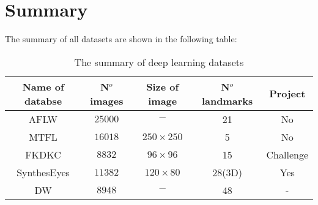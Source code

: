 \section{Summary}
The summary of all datasets are shown in the following table:\\
\begin{table}[!h]
	\centering
	\begin{tabular}{*{5}{c}}
		Name of databse & N$^{o}$ images & Size of image & N$^{o}$ landmarks & Project \\ \hline
		AFLW & $25000$ & $-$ & 21 & No \\ \hline
		MTFL & $16018$ & $250 \times 250$ & 5 & No \\ \hline
		FKDKC & $8832$ & $96 \times 96$ & 15 & Challenge \\ \hline
		SynthesEyes & $11382$ & $120 \times 80$ & 28(3D) & Yes \\ \hline
		DW & $8948$ & $-$ & 48 & - \\ \hline
	\end{tabular}
	\caption{The summary of deep learning datasets}
	\label{tb4}
\end{table}

